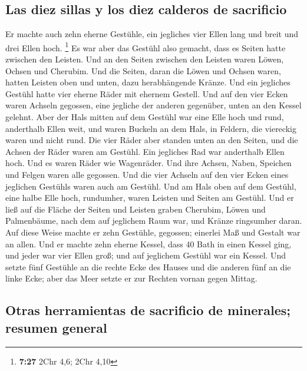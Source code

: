 \hypertarget{las-diez-sillas-y-los-diez-calderos-de-sacrificio}{%
\subsection{Las diez sillas y los diez calderos de
sacrificio}\label{las-diez-sillas-y-los-diez-calderos-de-sacrificio}}

 Er machte auch zehn eherne Gestühle, ein jegliches vier
Ellen lang und breit und drei Ellen hoch. \footnote{\textbf{7:27} 2Chr
  4,6; 2Chr 4,10}  Es war aber das Gestühl also gemacht,
dass es Seiten hatte zwischen den Leisten.  Und an den
Seiten zwischen den Leisten waren Löwen, Ochsen und Cherubim. Und die
Seiten, daran die Löwen und Ochsen waren, hatten Leisten oben und unten,
dazu herabhängende Kränze.  Und ein jegliches Gestühl
hatte vier eherne Räder mit ehernem Gestell. Und auf den vier Ecken
waren Achseln gegossen, eine jegliche der anderen gegenüber, unten an
den Kessel gelehnt.  Aber der Hals mitten auf dem Gestühl
war eine Elle hoch und rund, anderthalb Ellen weit, und waren Buckeln an
dem Hals, in Feldern, die viereckig waren und nicht rund.
 Die vier Räder aber standen unten an den Seiten, und die
Achsen der Räder waren am Gestühl. Ein jegliches Rad war anderthalb
Ellen hoch.  Und es waren Räder wie Wagenräder. Und ihre
Achsen, Naben, Speichen und Felgen waren alle gegossen. 
Und die vier Achseln auf den vier Ecken eines jeglichen Gestühls waren
auch am Gestühl.  Und am Hals oben auf dem Gestühl, eine
halbe Elle hoch, rundumher, waren Leisten und Seiten am Gestühl.
 Und er ließ auf die Fläche der Seiten und Leisten graben
Cherubim, Löwen und Palmenbäume, nach dem auf jeglichem Raum war, und
Kränze ringsumher daran.  Auf diese Weise machte er zehn
Gestühle, gegossen; einerlei Maß und Gestalt war an allen.
 Und er machte zehn eherne Kessel, dass 40 Bath in einen
Kessel ging, und jeder war vier Ellen groß; und auf jeglichem Gestühl
war ein Kessel.  Und setzte fünf Gestühle an die rechte
Ecke des Hauses und die anderen fünf an die linke Ecke; aber das Meer
setzte er zur Rechten vornan gegen Mittag.

\hypertarget{otras-herramientas-de-sacrificio-de-minerales-resumen-general}{%
\subsection{Otras herramientas de sacrificio de minerales; resumen
general}\label{otras-herramientas-de-sacrificio-de-minerales-resumen-general}}

